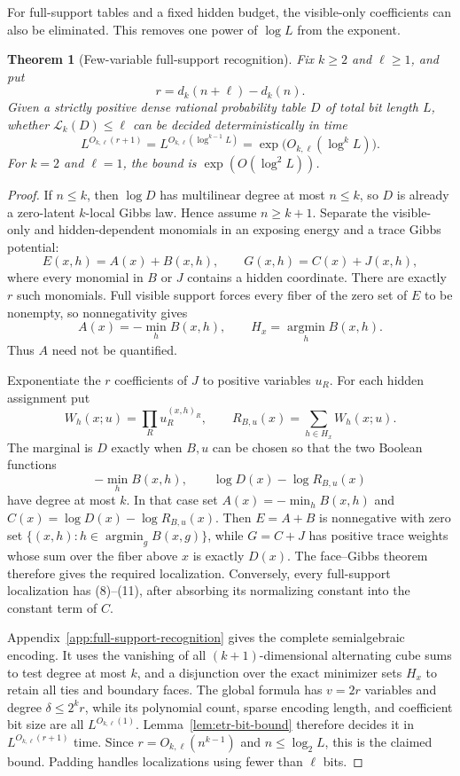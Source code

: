 \documentclass{article}
\newcommand{\LC}{\mathcal{L}}
\newtheorem{theorem}{Theorem}
\begin{document}
For full-support tables and a fixed hidden budget, the visible-only
coefficients can also be eliminated.  This removes one power of $\log L$ from
the exponent.

\begin{theorem}[Few-variable full-support recognition]
\label{thm:full-support-recognition}
Fix $k\ge2$ and $\ell\ge1$, and put
\[
  r=d_k(n+\ell)-d_k(n).
\]
Given a strictly positive dense rational probability table $D$ of total bit
length $L$,
whether $\LC_k(D)\le\ell$ can be decided deterministically in time
\[
  L^{O_{k,\ell}(r+1)}
  =L^{O_{k,\ell}(\log^{k-1}L)}
  =\exp\!\bigl(O_{k,\ell}(\log^kL)\bigr).
\]
For $k=2$ and $\ell=1$, the bound is $\exp(O(\log^2L))$.
\end{theorem}

\begin{proof}
If $n\le k$, then $\log D$ has multilinear degree at most $n\le k$, so $D$
is already a zero-latent $k$-local Gibbs law.  Hence assume $n\ge k+1$.
Separate the visible-only and hidden-dependent monomials in an exposing
energy and a trace Gibbs potential:
\[
  E(x,h)=A(x)+B(x,h),\qquad
  G(x,h)=C(x)+J(x,h),
  \tag{8}
\]
where every monomial in $B$ or $J$ contains a hidden coordinate.  There are
exactly $r$ such monomials.  Full visible support forces every fiber of the
zero set of $E$ to be nonempty, so nonnegativity gives
\[
  A(x)=-\min_hB(x,h),\qquad
  H_x=\operatorname*{argmin}_hB(x,h).
  \tag{9}
\]
Thus $A$ need not be quantified.

Exponentiate the $r$ coefficients of $J$ to positive variables $u_R$.  For
each hidden assignment put
\[
  W_h(x;u)=\prod_Ru_R^{(x,h)_R},
  \qquad
  R_{B,u}(x)=\sum_{h\in H_x}W_h(x;u).
  \tag{10}
\]
The marginal is $D$ exactly when $B,u$ can be chosen so that the two Boolean
functions
\[
  -\min_hB(x,h),\qquad
  \log D(x)-\log R_{B,u}(x)
  \tag{11}
\]
have degree at most $k$.  In that case set
$A(x)=-\min_hB(x,h)$ and
$C(x)=\log D(x)-\log R_{B,u}(x)$.  Then
$E=A+B$ is nonnegative with zero set
$\{(x,h):h\in\operatorname*{argmin}_gB(x,g)\}$, while $G=C+J$ has positive
trace weights whose sum over the fiber above $x$ is exactly $D(x)$.
The face--Gibbs theorem therefore gives the required localization.
Conversely, every full-support localization has (8)--(11), after absorbing its
normalizing constant into the constant term of $C$.

Appendix~\ref{app:full-support-recognition} gives the complete semialgebraic
encoding.  It uses the vanishing of all $(k+1)$-dimensional alternating cube
sums to test degree at most $k$, and a disjunction over the exact minimizer
sets $H_x$ to retain all ties and boundary faces.  The global formula has
$v=2r$ variables and degree $\delta\le2^kr$, while its polynomial count,
sparse encoding length, and coefficient bit size are all
$L^{O_{k,\ell}(1)}$.  Lemma~\ref{lem:etr-bit-bound} therefore decides it in
$L^{O_{k,\ell}(r+1)}$ time.
Since $r=O_{k,\ell}(n^{k-1})$ and $n\le\log_2L$, this is the claimed bound.
Padding handles localizations using fewer than $\ell$ bits.
\end{proof}
\end{document}
